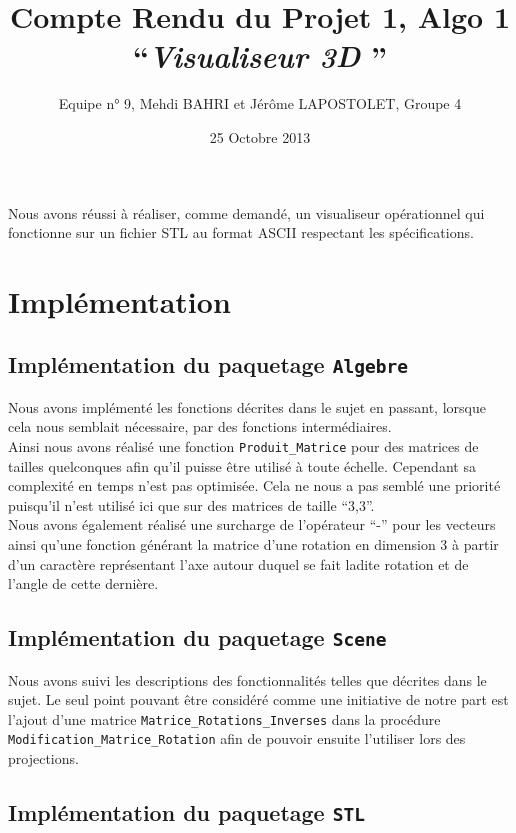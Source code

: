\documentclass[10pt]{article}
\title{Compte Rendu du Projet 1, Algo 1\\
``{\em Visualiseur 3D }'' }
\author{Equipe n° 9, Mehdi BAHRI et Jérôme LAPOSTOLET, Groupe 4}
\date{25 Octobre 2013}
\begin{document}
\maketitle

Nous avons réussi à réaliser, comme demandé, un visualiseur opérationnel qui fonctionne sur un fichier STL au format ASCII respectant les spécifications.

\section{Implémentation}

\subsection{Implémentation du paquetage \lstinline!Algebre!}

Nous avons implémenté les fonctions décrites dans le sujet en passant, lorsque cela nous semblait nécessaire, par des fonctions intermédiaires.\\
Ainsi nous avons réalisé une fonction \lstinline!Produit_Matrice! pour des matrices de tailles quelconques afin qu'il puisse être utilisé à toute échelle. Cependant sa complexité en temps n'est pas optimisée. Cela ne nous a pas semblé une priorité puisqu'il n'est utilisé ici que sur des matrices de taille ``3,3''.\\
Nous avons également réalisé une surcharge de l'opérateur ``-'' pour les vecteurs ainsi qu'une fonction générant la matrice d'une rotation en dimension 3 à partir d'un caractère représentant l'axe autour duquel se fait ladite rotation et de l'angle de cette dernière.

\subsection{Implémentation du paquetage \lstinline!Scene!}

Nous avons suivi les descriptions des fonctionnalités telles que décrites dans le sujet. Le seul point pouvant être considéré comme une initiative de notre part est l'ajout d'une matrice \lstinline!Matrice_Rotations_Inverses! dans la procédure \lstinline!Modification_Matrice_Rotation! afin de pouvoir ensuite l'utiliser lors des projections.

\subsection{Implémentation du paquetage \lstinline!STL!}
\end{document}
